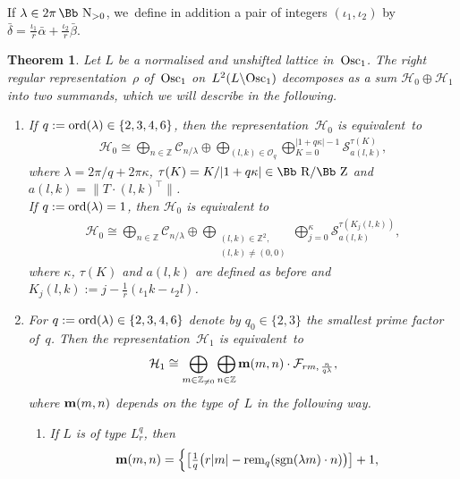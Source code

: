 \documentclass[10pt,a4paper]{amsart}
\newcommand\RR{{\mbox{\Bb R}}}
\newcommand\NN{{\mbox{\Bb N}}}
\newcommand\ZZ{{\mbox{\Bb Z}}}
\newcommand\Z{{\mathbb Z}}
\newcommand\bm{\textbf{{\rm \textbf{m}}}}
\newcommand\cC{{\mathcal C}}
\newcommand\cH{{\mathcal H}}
\newcommand\cF{{\mathcal F}}
\newcommand\cO{{\mathcal O}}
\newcommand{\Osc}{{\rm Osc}}
\newcommand{\sgn}{\mathop{{\rm sgn}}}
\newcommand{\rem}{\mathop{{\rm rem}}}
\newcommand{\ord}{{\rm ord}}
\numberwithin{equation}{section}
\newtheorem{Theorem}{Theorem}[section]
\begin{document}
If $\lambda\in 2\pi\,\NN_{>0}$, we~define in addition a pair of integers $(\iota_1,\iota_2)$ by $\bar\delta=\frac{\iota_1}r\bar\alpha+\frac{\iota_2}r\bar\beta$.


\begin{Theorem}\label{theo}
Let $L$ be a normalised and unshifted lattice in~$\Osc_1$. The right regular representation~$\rho$ of~$\Osc_1$ on~$L^2(L\backslash\Osc_1)$ decomposes as a sum $\cH_0\oplus\cH_1$ into two summands, which we will describe in the following.
\begin{enumerate}\itemsep=0pt
\item[$1.$] If $q:=\ord(\lambda)\in\{2,3,4,6\}$, then the representation~$\cH_0$ is equivalent~to
\begin{gather}\label{EH0q>1}
\cH_0\cong\bigoplus_{n\in \Z} \cC_{n/\lambda} \oplus \bigoplus
_{(l,k)\in\cO_q}\bigoplus_{K=0}^{|1+q\kappa|-1} {\mathcal S}_{a(l,k)}^{\tau(K)},
\end{gather}
where $\lambda=2\pi/q+2\pi\kappa$, $\tau(K)=K/|1+q\kappa|\in\RR/\ZZ$
and $a(l,k)= \big\|T\cdot (l,k)^\top\big\|$.
\\
If $q:=\ord(\lambda)=1$, then $\cH_0$ is equivalent to
\begin{gather}\label{EH0q=1}
\cH_0\cong\bigoplus_{n\in \Z} \cC_{n/\lambda} \oplus \bigoplus _{\substack{(l,k)\in\Z^2,\\(l,k)\not=(0,0)}} \bigoplus_{j=0}^{\kappa} {\mathcal S}_{a(l,k)}^{\tau(K_j(l,k))},
\end{gather}
where $\kappa$, $\tau(K)$ and $a(l,k)$ are defined as before and $K_j(l,k):=j-\frac1{r}(\iota_1 k-\iota_2l)$.
\item[$2.$]
For $q:=\ord(\lambda)\in\{2,3,4,6\}$ denote by $q_0\in\{2,3\}$ the smallest prime factor of~$q$. Then the representation~$\cH_1$ is equivalent~to
\begin{gather*}
\cH_1\cong \bigoplus_{m\in \Z_{\not=0}} \bigoplus_{n\in\Z} \bm(m,n)\cdot \cF_{rm,\,\frac n{q\lambda}},
\end{gather*}
where $\bm(m,n)$ depends on the type of~$L$ in the following way.
\begin{enumerate}\itemsep=0pt
\item[$(a)$] If $L$ is of type $L_r^q$, then
\begin{gather*}
\bm(m,n) =\begin{cases}
\big[\frac1q \big({r|m|-\rem_q(\sgn(\lambda m)\cdot n)}\big)\big]+1,

\end{cases}
\end{gather*}
\end{enumerate}
\end{enumerate}
\end{Theorem}
\end{document}
